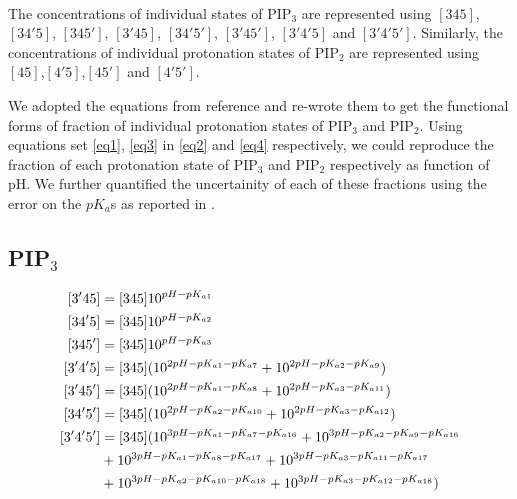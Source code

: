 \documentclass[12pt]{article}
\begin{document}
\maketitle



\paragraph{}
The concentrations of individual states of PIP$_3$ are represented using $[345]$, $[34'5]$, $[345']$, $[3'45]$,
$[34'5']$, $[3'45']$, $[3'4'5]$ and $[3'4'5']$. Similarly, the concentrations of individual protonation states of 
PIP$_2$ are represented using $[45]$,$[4'5]$,$[45']$ and $[4'5']$.

We adopted the equations from reference\cite{graber2018effect} and re-wrote them 
to get the functional forms of fraction of individual protonation states of PIP$_3$ and PIP$_2$.
Using equations set \ref{eq1}, \ref{eq3} in \ref{eq2} and \ref{eq4} respectively, we could reproduce the fraction of each protonation state 
of PIP$_3$ and PIP$_2$ respectively as function of pH. We further quantified the uncertainity of each of these fractions using the
error on the $pK_{a}$s as reported in \cite{graber2018effect}.


\subsection*{PIP$_3$}
\begin{equation} \label{eq1}
\begin{split}
[3'45] & = [345] 10^{pH-pK_{a1}} \\
[34'5] & = [345] 10^{pH-pK_{a2}} \\
[345'] & = [345] 10^{pH-pK_{a3}} \\
[3'4'5] & = [345] (10^{2pH-pK_{a1}-pK_{a7}} + 10^{2pH-pK_{a2}-pK_{a9}} ) \\
[3'45'] & = [345] (10^{2pH-pK_{a1}-pK_{a8}} + 10^{2pH-pK_{a3}-pK_{a11}} ) \\
[34'5'] & = [345] (10^{2pH-pK_{a2}-pK_{a10}} + 10^{2pH-pK_{a3}-pK_{a12}} ) \\
[3'4'5'] & = [345] \huge(10^{3pH-pK_{a1}-pK_{a7}-pK_{a16}} + 10^{3pH-pK_{a2}-pK_{a9}-pK_{a16}} \\
& + 10^{3pH-pK_{a1}-pK_{a8}-pK_{a17}} + 10^{3pH-pK_{a3}-pK_{a11}-pK_{a17}}  \\
& + 10^{3pH-pK_{a2}-pK_{a10}-pK_{a18}} + 10^{3pH-pK_{a3}-pK_{a12}-pK_{a18}} \huge)
\end{split}
\end{equation}
\end{document}
